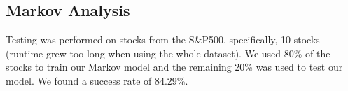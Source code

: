 \documentclass[final]{article}
\begin{document}















\subsection{Markov Analysis}

Testing was performed on stocks from the S\&P500, specifically, 10
stocks (runtime grew too long when using the whole dataset). We used
80\% of the stocks to train our Markov model and the remaining 20\%
was used to test our model. We found a success rate of 84.29\%.

\end{document}
